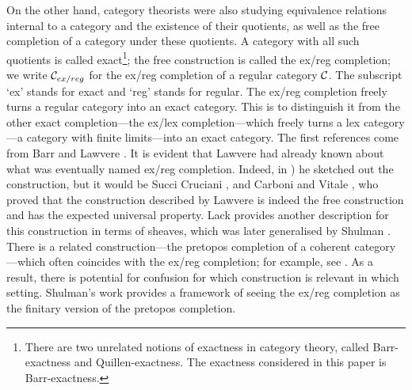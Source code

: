 On the other hand, category theorists were also studying equivalence relations internal to a category and the existence of their quotients, as well as the free completion of a category under these quotients. A category with all such quotients is called exact\footnote{There are two unrelated notions of exactness in category theory, called Barr-exactness and Quillen-exactness. The exactness considered in this paper is Barr-exactness.}; the free construction is called the ex/reg completion; we write $\mathcal{C}_{ex/reg}$ for the ex/reg completion of a regular category $\mathcal{C}$. The subscript `ex' stands for exact and `reg' stands for regular. The ex/reg completion freely turns a regular category into an exact category. This is to distinguish it from the other exact completion---the ex/lex completion---which freely turns a lex category---a category with finite limits---into an exact category. The first references come from Barr \cite{Barrbook} and Lawvere \cite{Lawvere_Perugia}. 
It is evident that Lawvere had already known about what was eventually named ex/reg completion. Indeed, in \cite[pp.~84--85]{Lawvere_Perugia}) he sketched out the construction, but it would be Succi Cruciani \cite{cruciani}, and Carboni and Vitale \cite{CarboniA.1998Raec}, who proved that the construction described by Lawvere is indeed the free construction and has the expected universal property. Lack \cite{LackStephen1999Anot} provides another description for this construction in terms of sheaves, which was later generalised by Shulman \cite{ShulmanMichael2012Ecas}. There is a related construction---the pretopos completion of a coherent category---which often coincides with the ex/reg completion; for example, see \cite[Proposition 5.1]{EmmeneggerJacopo2020Edac}. As a result, there is potential for confusion for which construction is relevant in which setting. Shulman's work \cite{ShulmanMichael2012Ecas} provides a framework of seeing the ex/reg completion as the finitary version of the pretopos completion.

\smallskip

